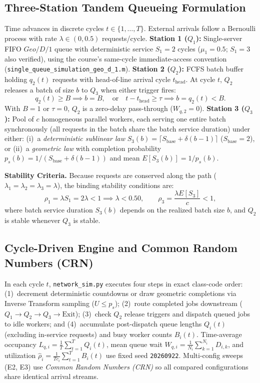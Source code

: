 \documentclass[conference]{IEEEtran}
\begin{document}
\subsection{Three-Station Tandem Queueing Formulation}
Time advances in discrete cycles $t \in \{1, \dots, T\}$. External arrivals follow a Bernoulli process with rate $\lambda \in (0, 0.5)$ requests/cycle.
\textbf{Station 1 ($Q_1$):} Single-server FIFO $Geo/D/1$ queue with deterministic service $S_1 = 2$ cycles ($\mu_1 = 0.5$; $S_1 = 3$ also verified), using the course's same-cycle immediate-access convention (\texttt{single\_queue\_simulation\_geo\_d\_1.m}).
\textbf{Station 2 ($Q_2$):} FCFS batch buffer holding $q_2(t)$ requests with head-of-line arrival cycle $t_{\text{head}}$. At cycle $t$, $Q_2$ releases a batch of size $b$ to $Q_3$ when either trigger fires:
\begin{equation}
q_2(t) \ge B \implies b = B, \quad \text{or} \quad t - t_{\text{head}} \ge \tau \implies b = q_2(t) < B.
\end{equation}
With $B{=}1$ or $\tau{=}0$, $Q_2$ is a zero-delay pass-through ($W_{q,2}{=}0$).
\textbf{Station 3 ($Q_3$):} Pool of $c$ homogeneous parallel workers, each serving one entire batch synchronously (all requests in the batch share the batch service duration) under either: (i)~a \emph{deterministic sublinear law} $S_3(b) = \lceil S_{\text{base}} + \delta(b - 1) \rceil$ ($S_{\text{base}}{=}2$), or (ii)~a \emph{geometric law} with completion probability $p_s(b) = 1/(S_{\text{base}} + \delta(b - 1))$ and mean $E[S_3(b)] = 1/p_s(b)$.

\textbf{Stability Criteria.} Because requests are conserved along the path ($\lambda_1 = \lambda_2 = \lambda_3 = \lambda$), the binding stability conditions are:
\begin{equation}
\rho_1 = \lambda S_1 = 2\lambda < 1 \implies \lambda < 0.50, \qquad \rho_3 = \frac{\lambda E[S_3]}{c} < 1,
\end{equation}
where batch service duration $S_3(b)$ depends on the realized batch size $b$, and $Q_2$ is stable whenever $Q_3$ is stable.

\subsection{Cycle-Driven Engine and Common Random Numbers (CRN)}
In each cycle $t$, \texttt{network\_sim.py} executes four steps in exact class-code order: (1)~decrement deterministic countdowns or draw geometric completions via Inverse Transform sampling ($U \le p_s$); (2)~route completed jobs downstream ($Q_1 \to Q_2 \to Q_3 \to \text{Exit}$); (3)~check $Q_2$ release triggers and dispatch queued jobs to idle workers; and (4)~accumulate post-dispatch queue lengths $Q_i(t)$ (excluding in-service requests) and busy worker counts $B_i(t)$. Time-average occupancy $L_{q,i} = \frac{1}{T}\sum_{t=1}^T Q_i(t)$, mean queue wait $W_{q,i} = \frac{1}{N_i}\sum_{k=1}^{N_i} D_{i,k}$, and utilization $\hat{\rho}_i = \frac{1}{Tc_i}\sum_{t=1}^T B_i(t)$ use fixed seed \texttt{20260922}. Multi-config sweeps (E2, E3) use \emph{Common Random Numbers (CRN)} so all compared configurations share identical arrival streams.
\end{document}
